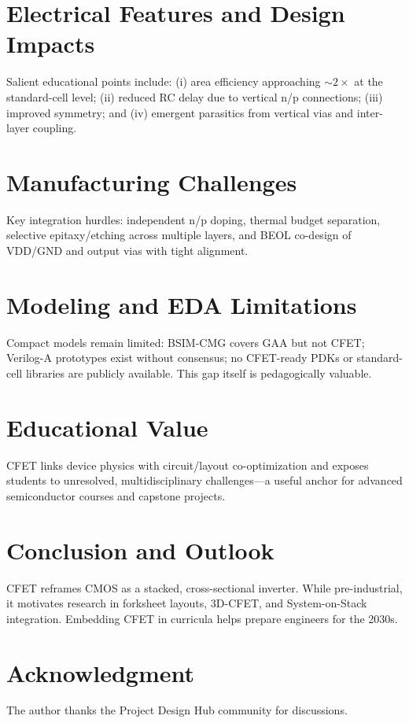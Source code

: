 \documentclass[conference]{IEEEtran}
\begin{document}
\section{Electrical Features and Design Impacts}
Salient educational points include: (i) area efficiency approaching
$\sim\!2\times$ at the standard-cell level; (ii) reduced RC delay due
to vertical n/p connections; (iii) improved symmetry; and (iv)
emergent parasitics from vertical vias and inter-layer coupling.

\section{Manufacturing Challenges}
Key integration hurdles: independent n/p doping, thermal budget
separation, selective epitaxy/etching across multiple layers, and
BEOL co-design of VDD/GND and output vias with tight alignment.

\section{Modeling and EDA Limitations}
Compact models remain limited: BSIM-CMG covers GAA but not CFET;
Verilog-A prototypes exist without consensus; no CFET-ready PDKs or
standard-cell libraries are publicly available. This gap itself is
pedagogically valuable.

\section{Educational Value}
CFET links device physics with circuit/layout co-optimization and
exposes students to unresolved, multidisciplinary challenges---a
useful anchor for advanced semiconductor courses and capstone projects.

\section{Conclusion and Outlook}
CFET reframes CMOS as a stacked, cross-sectional inverter. While
pre-industrial, it motivates research in forksheet layouts, 3D-CFET,
and System-on-Stack integration. Embedding CFET in curricula helps
prepare engineers for the 2030s.

\section*{Acknowledgment}
The author thanks the Project Design Hub community for discussions.



\end{document}
